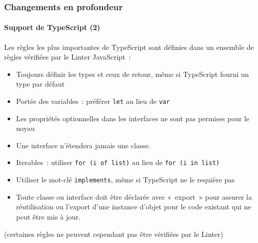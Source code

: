 \begin{frame}[fragile]
	\frametitle{Changements en profondeur}
	\framesubtitle{Support de TypeScript (2)}

	Les règles les plus importantes de TypeScript sont définies dans un ensemble de règles vérifiées par le
	Linter JavaScript~:

	\begin{itemize}\smaller
		\item Toujours définir les types et ceux de retour, même si TypeScript fourni un type par défaut
		\item Portée des variables~: préférer \texttt{let} au lieu de \texttt{var}
		\item Les propriétés optionnelles dans les interfaces ne sont pas permises pour le noyau
		\item Une interface n'étendera jamais une classe.
		\item Iterables~: utiliser \texttt{for (i of list)} au lieu de \texttt{for (i in list)}
		\item Utiliser le mot-clé \texttt{implements}, même si TypeScript ne le requière pas
		\item Toute classe ou interface doit être déclarée avec «~export~» pour assurer la
			réutilisation ou l'export d'une instance d'objet pour le code existant qui ne peut être mis à jour.
	\end{itemize}

	\small(certaines règles ne peuvent cependant pas être vérifiées par le Linter)\normalsize

\end{frame}


